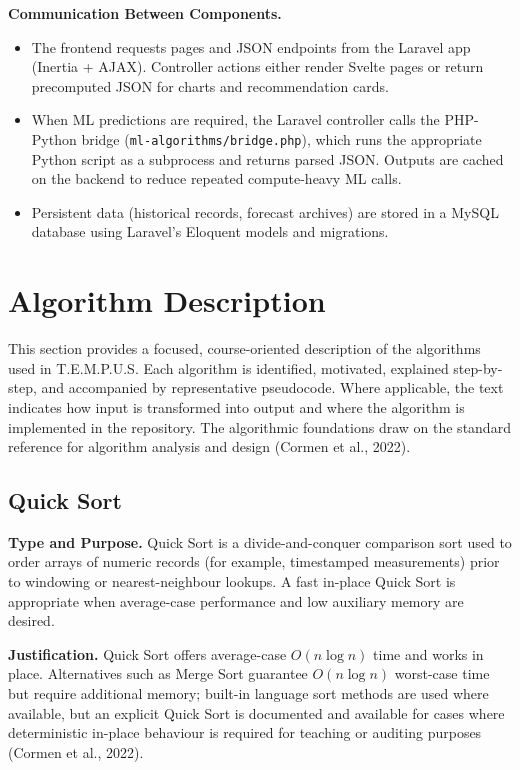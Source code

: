 \documentclass[12pt]{article}
\begin{document}
\noindent\textbf{Communication Between Components.}
\begin{itemize}
    \item The frontend requests pages and JSON endpoints from the Laravel app (Inertia + AJAX). Controller actions either render Svelte pages or return precomputed JSON for charts and recommendation cards.
    \item When ML predictions are required, the Laravel controller calls the PHP-Python bridge (\texttt{ml-algorithms/bridge.php}), which runs the appropriate Python script as a subprocess and returns parsed JSON. Outputs are cached on the backend to reduce repeated compute-heavy ML calls.
    \item Persistent data (historical records, forecast archives) are stored in a MySQL database using Laravel's Eloquent models and migrations.
\end{itemize}

\section{Algorithm Description}

This section provides a focused, course-oriented description of the algorithms used in T.E.M.P.U.S. Each algorithm is identified, motivated, explained step-by-step, and accompanied by representative pseudocode. Where applicable, the text indicates how input is transformed into output and where the algorithm is implemented in the repository. The algorithmic foundations draw on the standard reference for algorithm analysis and design (Cormen et al., 2022).

\subsection{Quick Sort}

\noindent\textbf{Type and Purpose.} Quick Sort is a divide-and-conquer comparison sort used to order arrays of numeric records (for example, timestamped measurements) prior to windowing or nearest-neighbour lookups. A fast in-place Quick Sort is appropriate when average-case performance and low auxiliary memory are desired.

\noindent\textbf{Justification.} Quick Sort offers average-case $O(n\log n)$ time and works in place. Alternatives such as Merge Sort guarantee $O(n\log n)$ worst-case time but require additional memory; built-in language sort methods are used where available, but an explicit Quick Sort is documented and available for cases where deterministic in-place behaviour is required for teaching or auditing purposes (Cormen et al., 2022).
\end{document}
